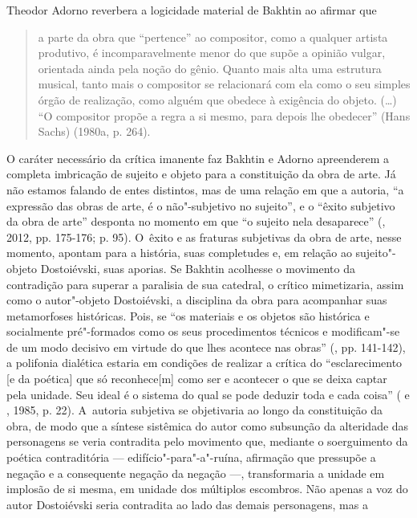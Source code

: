 Theodor Adorno reverbera a logicidade material de Bakhtin ao afirmar que

\begin{quote}
a parte da obra que ``pertence'' ao compositor, como a qualquer artista
produtivo, é incomparavelmente menor do que supõe a opinião vulgar,
orientada ainda pela noção do gênio. Quanto mais alta uma estrutura
musical, tanto mais o compositor se relacionará com ela como o seu
simples órgão de realização, como alguém que obedece à exigência do
objeto. (\ldots) ``O compositor propõe a regra a si mesmo, para depois lhe
obedecer'' (Hans Sachs) (1980a, p. 264).
\end{quote}

O caráter necessário da crítica imanente faz Bakhtin e Adorno
apreenderem a completa imbricação de sujeito e objeto para a
constituição da obra de arte. Já não estamos falando de entes distintos,
mas de uma relação em que a autoria, ``a expressão das obras de arte, é
o não"-subjetivo no sujeito'', e o ``êxito subjetivo da obra de arte''
desponta no momento em que ``o sujeito nela desaparece'' (, 2012,
pp. 175-176; p. 95). O~êxito e as fraturas subjetivas da obra de arte,
nesse momento, apontam para a história, suas completudes e, em relação
ao sujeito"-objeto Dostoiévski, suas aporias. Se Bakhtin acolhesse o
movimento da contradição para superar a paralisia de sua catedral, o
crítico mimetizaria, assim como o autor"-objeto Dostoiévski, a disciplina
da obra para acompanhar suas metamorfoses históricas. Pois, se ``os
materiais e os objetos são histórica e socialmente pré"-formados como os
seus procedimentos técnicos e modificam"-se de um modo decisivo em
virtude do que lhes acontece nas obras'' (, pp. 141-142), a
polifonia dialética estaria em condições de realizar a crítica do
``esclarecimento {[}e da poética{]} que só reconhece{[}m{]} como ser e
acontecer o que se deixa captar pela unidade. Seu ideal é o sistema do
qual se pode deduzir toda e cada coisa'' ( e , 1985, p.
22). A~autoria subjetiva se objetivaria ao longo da constituição da
obra, de modo que a síntese sistêmica do autor como subsunção da
alteridade das personagens se veria contradita pelo movimento que,
mediante o soerguimento da poética contraditória ---
edifício"-para"-a"-ruína, afirmação que pressupõe a negação e a consequente
negação da negação ---, transformaria a unidade em implosão de si mesma,
em unidade dos múltiplos escombros. Não apenas a voz do autor
Dostoiévski seria contradita ao lado das demais personagens, mas a
